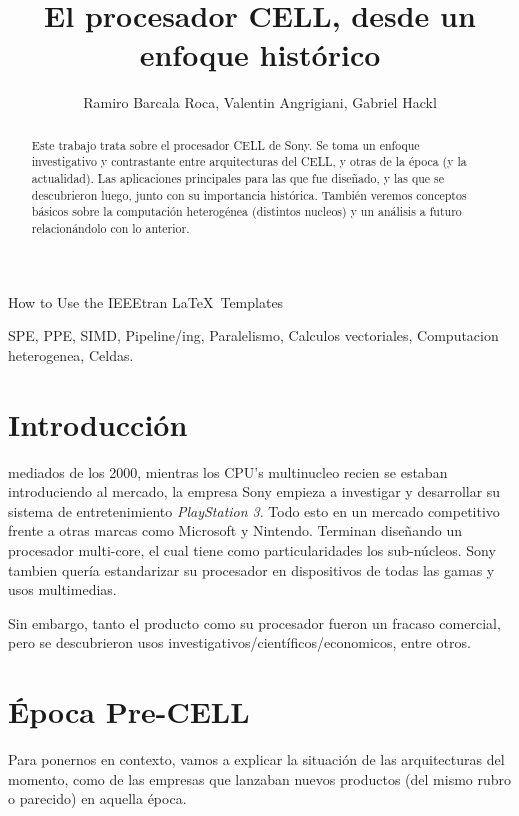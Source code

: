 \documentclass[10pt,compsoc]{IEEEtran}
\begin{document}
	\title{El procesador CELL, desde un enfoque
		histórico}
	\author{Ramiro Barcala Roca, Valentin Angrigiani, Gabriel Hackl}
		
	{How to Use the IEEEtran \LaTeX \ Templates}
	\maketitle
	
	\begin{abstract}
		Este trabajo trata sobre el procesador CELL de Sony. Se toma un enfoque investigativo y contrastante entre arquitecturas del CELL, y otras de la época (y la actualidad). Las aplicaciones principales para las que fue diseñado, y las que se descubrieron luego, junto con su importancia histórica. También veremos conceptos básicos sobre la computación heterogénea (distintos nucleos) y un análisis a futuro relacionándolo con lo anterior.
	\end{abstract}
	
	\begin{IEEEkeywords}
		SPE, PPE, SIMD, Pipeline/ing, Paralelismo, Calculos vectoriales, Computacion heterogenea, Celdas.
	\end{IEEEkeywords}
	
	\section{Introducción}
	 mediados de los 2000, mientras los CPU's multinucleo recien se estaban introduciendo al mercado, la empresa Sony empieza a investigar y desarrollar su sistema de entretenimiento \textit{PlayStation 3}. Todo esto en un mercado competitivo frente a otras marcas como Microsoft y Nintendo. Terminan diseñando un procesador multi-core, el cual tiene como particularidades los sub-núcleos. Sony tambien quería estandarizar su procesador en dispositivos de todas las gamas y usos multimedias.
	
	Sin embargo, tanto el producto como su procesador fueron un fracaso comercial, pero se descubrieron usos investigativos/científicos/economicos, entre otros.
	
	
	\section{Época Pre-CELL}
	\noindent Para ponernos en contexto, vamos a explicar la situación de las arquitecturas del momento, como de las empresas que lanzaban nuevos productos (del mismo rubro o parecido) en aquella época.
	
\end{document}
